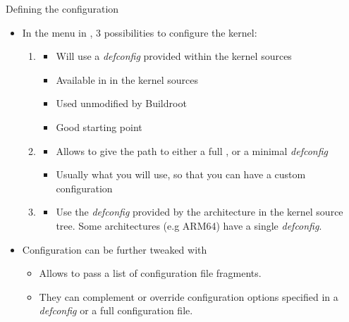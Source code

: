 \begin{frame}{Defining the configuration}
  \begin{itemize}
  \item In the  menu in , 3
    possibilities to configure the kernel:
    \begin{enumerate}
    \item {}
      \begin{itemize}
      \item Will use a {\em defconfig} provided within the kernel
        sources
      \item Available in  in the kernel
        sources
      \item Used unmodified by Buildroot
      \item Good starting point
      \end{itemize}
    \item {}
      \begin{itemize}
      \item Allows to give the path to either a full ,
        or a minimal {\em defconfig}
      \item Usually what you will use, so that you can have a custom
        configuration
      \end{itemize}
    \item {}
      \begin{itemize}
      \item Use the {\em defconfig} provided by the architecture in
        the kernel source tree. Some architectures (e.g ARM64) have a
        single {\em defconfig}.
      \end{itemize}
    \end{enumerate}
  \item Configuration can be further tweaked with 
    \begin{itemize}
    \item Allows to pass a list of configuration file fragments.
    \item They can complement or override configuration options
      specified in a {\em defconfig} or a full configuration file.
    \end{itemize}
  \end{itemize}
\end{frame}

